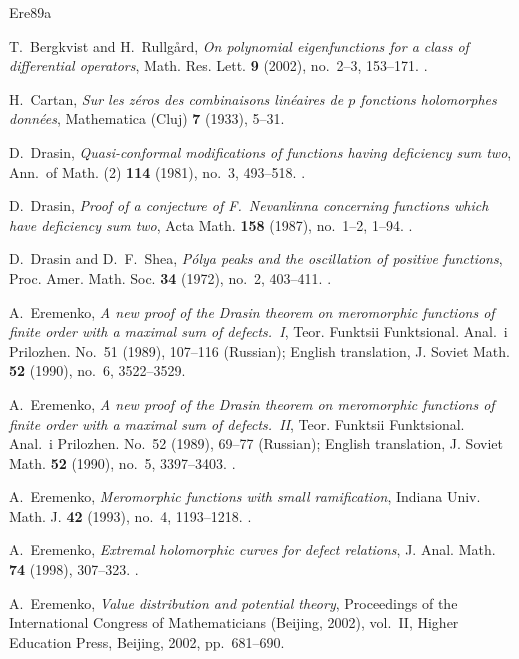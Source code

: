 \documentclass[11pt,letterpaper,reqno]{amsart}
\theoremstyle{remark}
\numberwithin{equation}{section}
\begin{document}
\begin{thebibliography}{Ere89a}
\raggedright

T.~Bergkvist and H.~Rullg\aa rd,
\emph{On polynomial eigenfunctions for a class of differential operators},
Math. Res. Lett. \textbf{9} (2002), no.~2--3, 153--171.
.

H.~Cartan,
\emph{Sur les z\'eros des combinaisons lin\'eaires de $p$ fonctions
holomorphes donn\'ees},
Mathematica (Cluj) \textbf{7} (1933), 5--31.

D.~Drasin,
\emph{Quasi-conformal modifications of functions having deficiency sum two},
Ann.\ of Math. (2) \textbf{114} (1981), no.~3, 493--518.
.

D.~Drasin,
\emph{Proof of a conjecture of F.~Nevanlinna concerning functions which
have deficiency sum two},
Acta Math. \textbf{158} (1987), no.~1--2, 1--94.
.

D.~Drasin and D.~F.~Shea,
\emph{P\'olya peaks and the oscillation of positive functions},
Proc. Amer. Math. Soc. \textbf{34} (1972), no.~2, 403--411.
.

A.~Eremenko,
\emph{A new proof of the Drasin theorem on meromorphic functions of finite
order with a maximal sum of defects.~I},
Teor. Funktsii Funktsional. Anal.\ i Prilozhen. No.~51 (1989), 107--116
(Russian); English translation, J. Soviet Math. \textbf{52} (1990),
no.~6, 3522--3529.

A.~Eremenko,
\emph{A new proof of the Drasin theorem on meromorphic functions of finite
order with a maximal sum of defects.~II},
Teor. Funktsii Funktsional. Anal.\ i Prilozhen. No.~52 (1989), 69--77
(Russian); English translation, J. Soviet Math. \textbf{52} (1990),
no.~5, 3397--3403.
.

A.~Eremenko,
\emph{Meromorphic functions with small ramification},
Indiana Univ. Math. J. \textbf{42} (1993), no.~4, 1193--1218.
.

A.~Eremenko,
\emph{Extremal holomorphic curves for defect relations},
J. Anal. Math. \textbf{74} (1998), 307--323.
.

A.~Eremenko,
\emph{Value distribution and potential theory},
Proceedings of the International Congress of Mathematicians
(Beijing, 2002), vol.~II, Higher Education Press, Beijing, 2002,
pp.~681--690.


\end{thebibliography}
\end{document}
